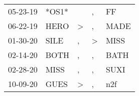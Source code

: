 \begin{supertabular}{p{0.07\textwidth}p{0.06\textwidth}p{0.02\textwidth}p{0.02\textwidth}p{0.06\textwidth}}
          05-23-19\textsuperscript{} &                            *OS1* &                  &             , &             FF\textsuperscript{} \\
          06-22-19\textsuperscript{} &           HERO\textsuperscript{} &     \textgreater &             , &           MADE\textsuperscript{} \\
          01-30-20\textsuperscript{} &           SILE\textsuperscript{} &                , &  \textgreater &           MISS\textsuperscript{} \\
          02-14-20\textsuperscript{} &           BOTH\textsuperscript{} &                , &             , &           BATH\textsuperscript{} \\
          02-28-20\textsuperscript{} &           MISS\textsuperscript{} &                , &             , &           SUXI\textsuperscript{} \\
          10-09-20\textsuperscript{} &           GUES\textsuperscript{} &     \textgreater &             , &            n2f\textsuperscript{} \\
\end{supertabular}
